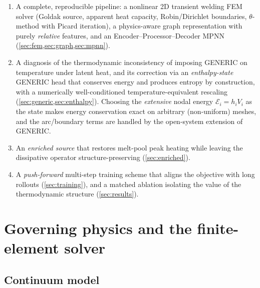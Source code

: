 \documentclass[11pt]{article}
\theoremstyle{definition}
\begin{document}
\begin{enumerate}[leftmargin=1.4em]
  \item A complete, reproducible pipeline: a nonlinear 2D transient welding FEM
  solver (Goldak source, apparent heat capacity, Robin/Dirichlet boundaries,
  $\theta$-method with Picard iteration), a physics-aware graph representation with
  purely \emph{relative} features, and an Encoder--Processor--Decoder MPNN
  (\cref{sec:fem,sec:graph,sec:mpnn}).
  \item A diagnosis of the thermodynamic inconsistency of imposing GENERIC on
  temperature under latent heat, and its correction via an \emph{enthalpy-state}
  GENERIC head that conserves energy and produces entropy by construction, with a
  numerically well-conditioned temperature-equivalent rescaling
  (\cref{sec:generic,sec:enthalpy}). Choosing the \emph{extensive} nodal energy
  $\mathcal E_i=h_iV_i$ as the state makes energy conservation exact on arbitrary
  (non-uniform) meshes, and the arc/boundary terms are handled by the open-system
  extension of GENERIC.
  \item An \emph{enriched source} that restores melt-pool peak heating while leaving
  the dissipative operator structure-preserving (\cref{sec:enriched}).
  \item A \emph{push-forward} multi-step training scheme that aligns the objective
  with long rollouts (\cref{sec:training}), and a matched ablation isolating the value
  of the thermodynamic structure (\cref{sec:results}).
\end{enumerate}

\section{Governing physics and the finite-element solver}
\label{sec:fem}

\subsection{Continuum model}
\end{document}
